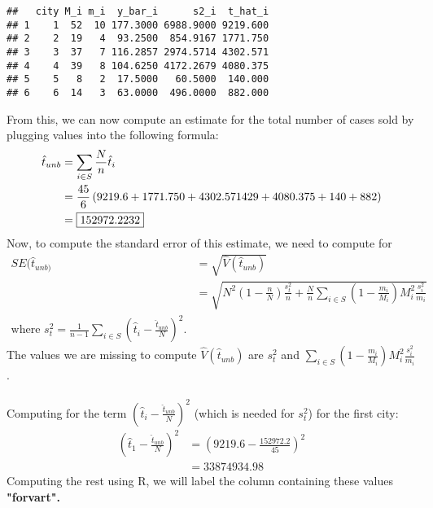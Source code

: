 \documentclass[]{article}
\newenvironment{Shaded}{\begin{snugshade}}{\end{snugshade}}
\newcommand{\AttributeTok}[1]{\textcolor[rgb]{0.13,0.29,0.53}{#1}}
\newcommand{\DecValTok}[1]{\textcolor[rgb]{0.00,0.00,0.81}{#1}}
\newcommand{\FloatTok}[1]{\textcolor[rgb]{0.00,0.00,0.81}{#1}}
\newcommand{\FunctionTok}[1]{\textcolor[rgb]{0.13,0.29,0.53}{\textbf{#1}}}
\newcommand{\NormalTok}[1]{#1}
\newcommand{\OtherTok}[1]{\textcolor[rgb]{0.56,0.35,0.01}{#1}}
\newcommand{\SpecialCharTok}[1]{\textcolor[rgb]{0.81,0.36,0.00}{\textbf{#1}}}
\begin{document}
\begin{verbatim}
##   city M_i m_i  y_bar_i      s2_i  t_hat_i
## 1    1  52  10 177.3000 6988.9000 9219.600
## 2    2  19   4  93.2500  854.9167 1771.750
## 3    3  37   7 116.2857 2974.5714 4302.571
## 4    4  39   8 104.6250 4172.2679 4080.375
## 5    5   8   2  17.5000   60.5000  140.000
## 6    6  14   3  63.0000  496.0000  882.000
\end{verbatim}

From this, we can now compute an estimate for the total number of cases sold by plugging values into the following formula:
\[
\begin{aligned}
\hat t_{unb} &= \sum_{i \in S}\frac{N}{n}\hat t_i \\
&= \frac{45}{6}\left(9219.6 + 1771.750 + 4302.571429 + 4080.375 + 140 + 882\right) \\
&= \fbox{152972.2232}
\end{aligned}
\]
Now, to compute the standard error of this estimate, we need to compute for 
\[
\begin{aligned}
SE(\hat t_{unb)} &= \sqrt{\hat V(\hat t_{unb})} \\
&= \sqrt{N^2(1-\frac{n}{N})\frac{s_t^2}{n} + \frac{N}{n}\sum_{i \in S}(1-\frac{m_i}{M_i})M_i^2\frac{s_i^2}{m_i}} \\
\text{where } s_t^2 = \frac{1}{n-1}\sum_{i \in S}\left(\hat t_i - \frac{\hat t_{unb}}{N}\right)^2.
\end{aligned}
\]
The values we are missing to compute $\hat  V(\hat t_{unb})$ are $s_t^2$ and $\sum_{i \in S}\left(1 - \frac{m_i}{M_i}\right)M_i^2\frac{s_i^2}{m_i}$. \\
\\
Computing for the term $(\hat t_i - \frac{\hat t_{unb}}{N})^2$ (which is needed for $s_t^2$) for the first city:
\[
\begin{aligned}
\left(\hat t_1 - \frac{\hat t_{unb}}{N}\right)^2 &= \left(9219.6 - \frac{152972.2}{45}\right)^2 \\
&= 33874934.98
\end{aligned}
\]
Computing the rest using R, we will label the column containing these values \textbf{"forvart".} \\

\begin{Shaded}
\end{Shaded}
\end{document}
